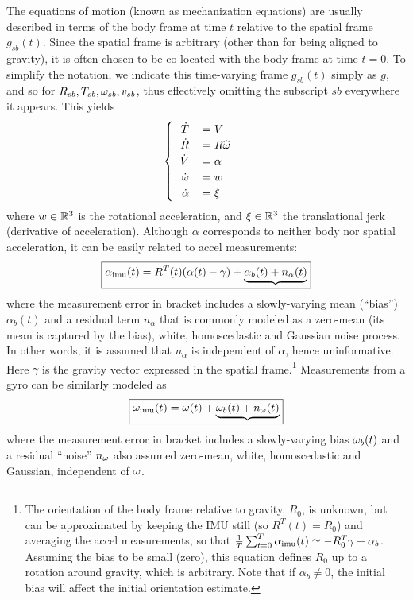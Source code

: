 The equations of motion (known as mechanization equations) are usually described in terms of the body frame at time $t$ relative to the spatial frame $g_{sb}(t)$. Since the spatial frame is arbitrary (other than for being aligned to gravity), it is often chosen to be co-located with the body frame at time $t = 0$. To simplify the notation, we indicate this time-varying frame $g_{sb}(t)$ simply as $g$, and so for $R_{sb}, T_{sb}, \omega_{sb}, v_{sb}$, thus effectively omitting the subscript $sb$ everywhere it appears. This yields
\begin{equation}
\begin{cases}
\begin{tabular}{rl}
$\dot T$ &$= V$ \\%
$\dot R$ &$= R \widehat \w$ \\%
$\dot V$ &$= \alpha$  \\%
$\dot \w$ &$= w$ \\
$\dot \alpha$ &$= \xi$
\end{tabular}
\end{cases}
\end{equation}
where $w \in \mathbb{R}^3$ is the rotational acceleration, and $\xi \in \mathbb{R}^3$ the translational jerk (derivative of acceleration). Although $\alpha$ corresponds to neither body nor spatial acceleration, it can be easily related to accel measurements: 
\begin{equation}
\boxed{\alpha_\mathrm{imu} (t) = R^T(t) (\alpha(t)- \gamma) + \underbrace{\alpha_b(t) + n_{\alpha}(t)}}
\label{eq-accel}
\end{equation}
where the measurement error in bracket includes a slowly-varying mean (``bias'') $\alpha_b(t)$ and a residual term $n_\alpha$ that is commonly modeled as a zero-mean (its mean is captured by the bias), white, homoscedastic and Gaussian noise process. In other words, it is assumed that $n_\alpha$ is independent of $\alpha$, hence uninformative. Here $\gamma$ is the gravity vector expressed in the spatial frame.\footnote{The orientation of the body frame relative to gravity, $R_0$, is unknown, but can be approximated by keeping the IMU still (so $R^T(t) = R_0$) and averaging the accel measurements, so that $\frac{1}{T}\sum_{t=0}^T \alpha_\mathrm{imu} (t)  \simeq  - R_0^T \gamma + \alpha_b$. Assuming the bias to be small (zero), this equation defines $R_0$ up to a rotation around gravity, which is arbitrary. Note that if $\alpha_b \neq 0$, the initial bias will affect the initial orientation estimate.} Measurements from a gyro can be similarly modeled as 
\begin{equation}
\boxed{\omega_\mathrm{imu} (t) = \omega(t) + \underbrace{\omega_b(t) + n_{\omega}(t)}}
\label{eq-gyro}
\end{equation}
where the measurement error in bracket includes a slowly-varying bias $\omega_b(t)$ and a residual ``noise'' $n_\omega$ also assumed zero-mean, white, homoscedastic and Gaussian, independent of $\omega$.

